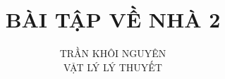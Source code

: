 \documentclass{article}
\title{\Huge{BÀI TẬP VỀ NHÀ 2}}
\newcommand{\f}[2]{\dfrac{#1}{#2}}
\begin{document}
\setlength{\parindent}{20pt}
\newpage
\author{TRẦN KHÔI NGUYÊN \\ VẬT LÝ LÝ THUYẾT}
\maketitle
\end{document}
